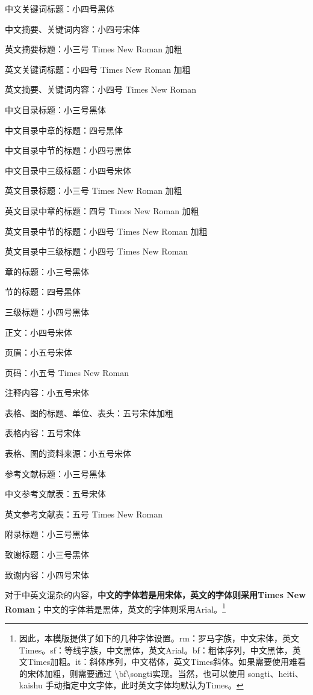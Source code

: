 \documentclass{xmu}
\begin{document}
\begin{appendix}
    中文关键词标题：小四号黑体\par
    中文摘要、关键词内容：小四号宋体\par
    英文摘要标题：小三号 Times New Roman 加粗\par
    英文关键词标题：小四号 Times New Roman 加粗\par
    英文摘要、关键词内容：小四号 Times New Roman\par
    中文目录标题：小三号黑体\par
    中文目录中章的标题：四号黑体\par
    中文目录中节的标题：小四号黑体\par
    中文目录中三级标题：小四号宋体\par
    英文目录标题：小三号 Times New Roman 加粗\par
    英文目录中章的标题：四号 Times New Roman 加粗\par
    英文目录中节的标题：小四号 Times New Roman 加粗\par
    英文目录中三级标题：小四号 Times New Roman\par
    章的标题：小三号黑体\par
    节的标题：四号黑体\par
    三级标题：小四号黑体\par
    正文：小四号宋体\par
    页眉：小五号宋体\par
    页码：小五号 Times New Roman\par
    注释内容：小五号宋体\par
    表格、图的标题、单位、表头：五号宋体加粗\par
    表格内容：五号宋体\par
    表格、图的资料来源：小五号宋体\par
    参考文献标题：小三号黑体\par
    中文参考文献表：五号宋体\par
    英文参考文献表：五号 Times New Roman\par
    附录标题：小三号黑体\par
    致谢标题：小三号黑体\par
    致谢内容：小四号宋体\par
    对于中英文混杂的内容，{\bf\songti 中文的字体若是用宋体，英文的字体则采用Times New Roman}；{\sf 中文的字体若是黑体，英文的字体则采用Arial}。\footnote{
        因此，本模版提供了如下的几种字体设置。rm：罗马字族，中文宋体，英文Times。sf：等线字族，中文黑体，英文Arial。bf：粗体序列，中文黑体，英文Times加粗。it：斜体序列，中文楷体，英文Times斜体。如果需要使用难看的宋体加粗，则需要通过 \textbackslash bf\textbackslash songti实现。当然，也可以使用 songti、heiti、kaishu 手动指定中文字体，此时英文字体均默认为Times。
    }


\end{appendix}
\end{document}
